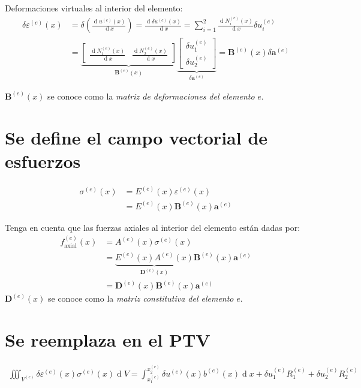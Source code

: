 \documentclass[12pt,landscape,letterpaper]{article}
\newcommand{\ve}[1]{{\boldsymbol{#1}}}
\newcommand{\ma}[1]{{\boldsymbol{#1}}}
\newcommand{\dd}{\operatorname{d} \!}
\begin{document}
Deformaciones virtuales al interior del elemento:
\begin{align}
\delta \varepsilon^{(e)}(x) &= \delta \left(\frac{\dd u^{(e)}(x)}{\dd x}\right) = \frac{\dd \delta u^{(e)}(x)}{\dd x} 
= \sum_{i=1}^2 \frac{\dd N_i^{(e)}(x)}{\dd x} \delta u_i^{(e)} \\
&= 
\underbrace{\begin{bmatrix}
   \frac{\dd N_1^{(e)}(x)}{\dd x} & \frac{\dd N_2^{(e)}(x)}{\dd x}
   \end{bmatrix}}_{\ma{B}^{(e)}(x)}
\underbrace{\begin{bmatrix}
  \delta u_1^{(e)} \\ \delta u_2^{(e)}
   \end{bmatrix}}_{\delta \ma{a}^{(e)}} = \ma{B}^{(e)}(x) \delta \ve{a}^{(e)}
\end{align}

$\ma{B}^{(e)}(x)$ se conoce como la \emph{matriz de deformaciones del elemento} $e$.

\newpage
\section{Se define el campo vectorial de esfuerzos}
\begin{align}
\sigma^{(e)}(x) 
&= E^{(e)}(x) \varepsilon^{(e)}(x) \\
&= E^{(e)}(x) \ma{B}^{(e)}(x) \ve{a}^{(e)}
\end{align}

Tenga en cuenta que las fuerzas axiales al interior del elemento están dadas por:
\begin{align}
f^{(e)}_{\text{axial}}(x) 
&= A^{(e)}(x) \sigma^{(e)}(x) \\
&= \underbrace{E^{(e)}(x) A^{(e)}(x)}_{\ma{D}^{(e)}(x)} \ma{B}^{(e)}(x) \ve{a}^{(e)} \\
&= \ma{D}^{(e)}(x) \ma{B}^{(e)}(x) \ve{a}^{(e)}
\end{align}
$\ma{D}^{(e)}(x)$ se conoce como la \emph{matriz constitutiva del elemento} $e$.

\newpage
\section{Se reemplaza en el PTV}
\begin{align}
\iiint_{V^{(e)}} \delta\varepsilon^{(e)}(x) \sigma^{(e)}(x) \dd V = \int_{x_1^{(e)}}^{x_2^{(e)}} \delta u^{(e)}(x) b^{(e)}(x) \dd x + \delta u_1^{(e)} R_1^{(e)} + \delta u_2^{(e)} R_2^{(e)}
\end{align}
\end{document}
